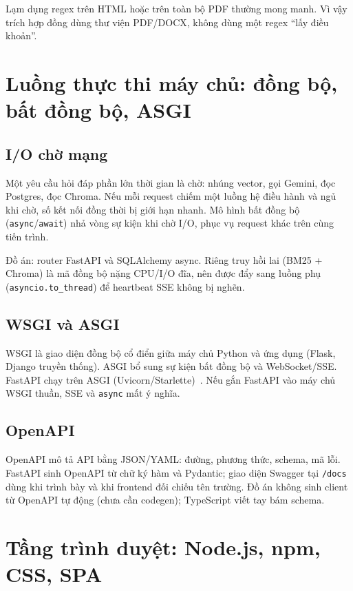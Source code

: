 Lạm dụng regex trên HTML hoặc trên toàn bộ PDF thường mong manh. Vì vậy trích
hợp đồng dùng thư viện PDF/DOCX, không dùng một regex ``lấy điều khoản''.

\section{Luồng thực thi máy chủ: đồng bộ, bất đồng bộ, ASGI}

\subsection{I/O chờ mạng}

Một yêu cầu hỏi đáp phần lớn thời gian là chờ: nhúng vector, gọi Gemini, đọc
Postgres, đọc Chroma. Nếu mỗi request chiếm một luồng hệ điều hành và ngủ khi
chờ, số kết nối đồng thời bị giới hạn nhanh. Mô hình bất đồng bộ
(\texttt{async}/\texttt{await}) nhả vòng sự kiện khi chờ I/O, phục vụ request
khác trên cùng tiến trình.

Đồ án: router FastAPI và SQLAlchemy async. Riêng truy hồi lai (BM25 + Chroma) là
mã đồng bộ nặng CPU/I/O đĩa, nên được đẩy sang luồng phụ
(\texttt{asyncio.to\_thread}) để heartbeat SSE không bị nghẽn.

\subsection{WSGI và ASGI}

WSGI là giao diện đồng bộ cổ điển giữa máy chủ Python và ứng dụng (Flask, Django
truyền thống). ASGI bổ sung sự kiện bất đồng bộ và WebSocket/SSE. FastAPI chạy
trên ASGI (Uvicorn/Starlette)~\cite{fastapi}. Nếu gắn FastAPI vào máy chủ WSGI
thuần, SSE và \texttt{async} mất ý nghĩa.

\subsection{OpenAPI}

OpenAPI mô tả API bằng JSON/YAML: đường, phương thức, schema, mã lỗi. FastAPI
sinh OpenAPI từ chữ ký hàm và Pydantic; giao diện Swagger tại \texttt{/docs} dùng
khi trình bày và khi frontend đối chiếu tên trường. Đồ án không sinh client từ
OpenAPI tự động (chưa cần codegen); TypeScript viết tay bám schema.

\section{Tầng trình duyệt: Node.js, npm, CSS, SPA}

